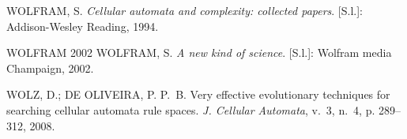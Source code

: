 \documentclass{llncs}
\begin{document}
\begin{thebibliography}{}
{WOLFRAM, S. \emph{Cellular automata and complexity: collected papers}. [S.l.]:
  Addison-Wesley Reading, 1994.}

WOLFRAM 2002
{WOLFRAM, S. \emph{A new kind of science}. [S.l.]: Wolfram media Champaign,
  2002.}

{WOLZ, D.; {DE OLIVEIRA}, P. P.~B. Very effective evolutionary techniques for
  searching cellular automata rule spaces.
\emph{J. Cellular Automata}, v.~3, n.~4, p. 289--312, 2008.}

\end{thebibliography}
\end{document}
